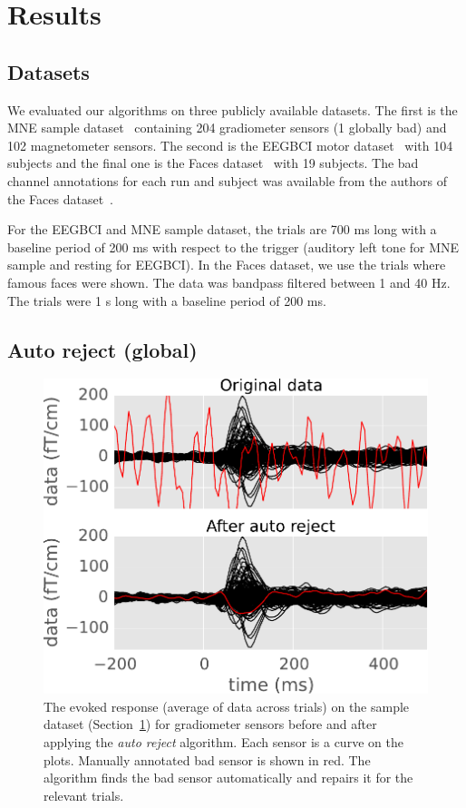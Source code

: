 \section{Results}
\label{sec:results}

\subsection{Datasets}
We evaluated our algorithms on three publicly available datasets. The first is the MNE sample dataset~\citep{gramfort2013meg} containing 204 gradiometer sensors (1 globally bad) and 102 magnetometer sensors. The second is the EEGBCI motor dataset~\citep{goldberger2000physiobank} with 104 subjects and the final one is the Faces dataset~\citep{wakeman2015multi} with 19 subjects. The bad channel annotations for each run and subject was available from the authors of the Faces dataset~\citep{wakeman2015multi}.

For the EEGBCI and MNE sample dataset, the trials are 700 ms long with a baseline period of 200 ms with respect to the trigger (auditory left tone for MNE sample and resting for EEGBCI). In the Faces dataset, we use the trials where famous faces were shown. The data was bandpass filtered between 1 and 40 Hz. The trials were 1 s long with a baseline period of 200 ms. 

\subsection{Auto reject (global)}

\begin{figure}[t!]
	\begin{center}
	\includegraphics[width=0.6\linewidth]{figures/figure4.pdf}
    \end{center}
    \caption{The evoked response (average of data across trials) on the sample dataset (Section~\ref{sec:results}) for gradiometer sensors before and after applying the \emph{auto reject} algorithm. Each sensor is a curve on the plots. Manually annotated bad sensor is shown in red. The algorithm finds the bad sensor automatically and repairs it for the relevant trials.
    }
    \label{fig:evoked}
\end{figure}

